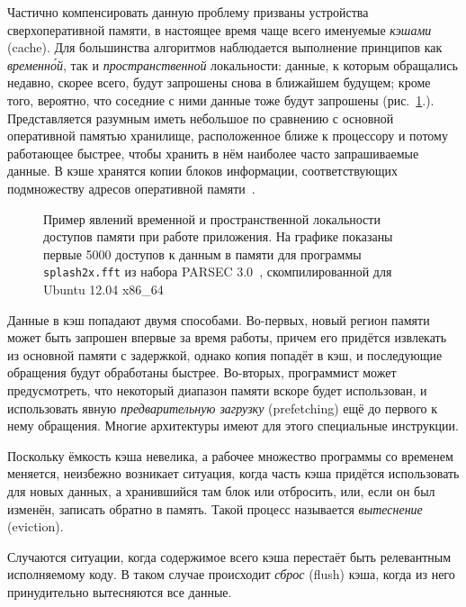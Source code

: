 Частично компенсировать данную проблему призваны устройства сверхоперативной памяти, в настоящее время чаще всего именуемые \textit{кэшами} (\abbr cache). Для большинства алгоритмов наблюдается выполнение принципов как \textit{временн\'ой}, так  и \textit{пространственной}  локальности: данные, к которым обращались недавно, скорее всего, будут запрошены снова в ближайшем будущем; кроме того, вероятно, что соседние с ними данные тоже будут запрошены (рис.~\ref{fig:locality}.). Представляется разумным иметь небольшое по сравнению с основной оперативной памятью хранилище, расположенное ближе к процессору и потому работающее быстрее, чтобы хранить в нём наиболее часто запрашиваемые данные. В кэше хранятся копии блоков информации, соответствующих подмножеству адресов оперативной памяти~\cite{ulrich-cpumemory, ulrich-cpumemory-rus}.

% 
\begin{figure}[htb]
    \centering
    \caption[Пример явлений временн\'ой и пространственной локальности]{Пример явлений временной и пространственной локальности доступов памяти при работе приложения. На графике показаны первые 5000 доступов к данным в памяти для программы \texttt{splash2x.fft} из набора PARSEC 3.0~\cite{parsec}, скомпилированной для Ubuntu 12.04 x86_64}
    \label{fig:locality}
\end{figure}

Данные в кэш попадают двумя способами. Во-первых, новый регион памяти может быть запрошен впервые за время работы, причем его придётся извлекать из основной памяти с задержкой, однако копия попадёт в кэш, и последующие обращения будут обработаны быстрее. Во-вторых, программист может предусмотреть, что некоторый диапазон памяти вскоре будет использован, и использовать явную \textit{предварительную загрузку} (\abbr prefetching) ещё до первого к нему обращения. Многие архитектуры имеют для этого специальные инструкции.

Поскольку ёмкость кэша невелика, а рабочее множество программы со временем меняется, неизбежно возникает ситуация, когда часть кэша придётся использовать для новых данных, а хранившийся там блок или отбросить, или, если он был изменён, записать обратно в память. Такой процесс называется \textit{вытеснение} (\abbr eviction).

Случаются ситуации, когда содержимое всего кэша перестаёт быть релевантным исполняемому коду. В таком случае происходит \textit{сброс} (\abbr flush) кэша, когда из него принудительно вытесняются все данные.

